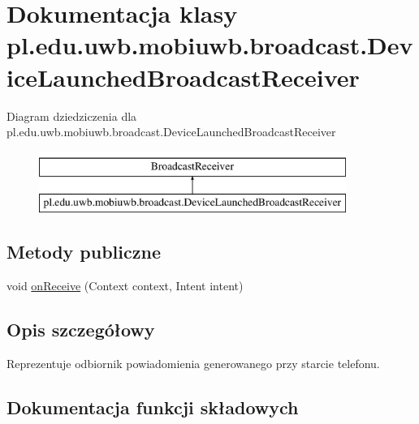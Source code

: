 \hypertarget{classpl_1_1edu_1_1uwb_1_1mobiuwb_1_1broadcast_1_1_device_launched_broadcast_receiver}{}\section{Dokumentacja klasy pl.\+edu.\+uwb.\+mobiuwb.\+broadcast.\+Device\+Launched\+Broadcast\+Receiver}
\label{classpl_1_1edu_1_1uwb_1_1mobiuwb_1_1broadcast_1_1_device_launched_broadcast_receiver}
Diagram dziedziczenia dla pl.\+edu.\+uwb.\+mobiuwb.\+broadcast.\+Device\+Launched\+Broadcast\+Receiver\begin{figure}[H]
\begin{center}
\leavevmode
\includegraphics[height=2.000000cm]{classpl_1_1edu_1_1uwb_1_1mobiuwb_1_1broadcast_1_1_device_launched_broadcast_receiver}
\end{center}
\end{figure}
\subsection*{Metody publiczne}
\begin{DoxyCompactItemize}
\item 
void \hyperlink{classpl_1_1edu_1_1uwb_1_1mobiuwb_1_1broadcast_1_1_device_launched_broadcast_receiver_a82fa5f92d267d845ba2e9d8c7aa1d6e8}{on\+Receive} (Context context, Intent intent)
\end{DoxyCompactItemize}


\subsection{Opis szczegółowy}
Reprezentuje odbiornik powiadomienia generowanego przy starcie telefonu. 

\subsection{Dokumentacja funkcji składowych}
\hypertarget{classpl_1_1edu_1_1uwb_1_1mobiuwb_1_1broadcast_1_1_device_launched_broadcast_receiver_a82fa5f92d267d845ba2e9d8c7aa1d6e8}{}
